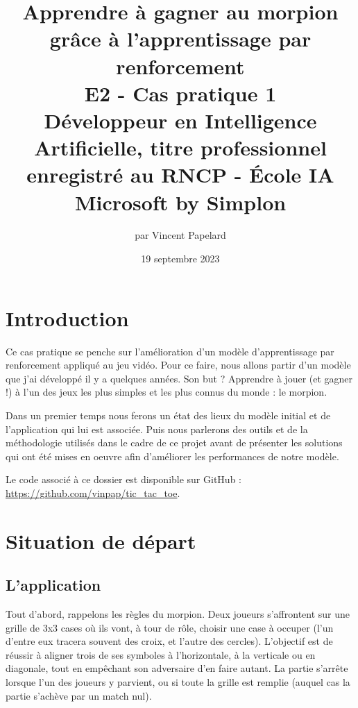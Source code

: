 \documentclass[french]{article}
\title{%
    \huge Apprendre à gagner au morpion grâce à l'apprentissage par renforcement  \\
    \bigskip
    \large E2 - Cas pratique 1 \\ 
    Développeur en Intelligence Artificielle,
    titre professionnel enregistré au RNCP - École IA Microsoft by Simplon}
\date{19 septembre 2023}
\author{par Vincent Papelard}
\begin{document}
    \maketitle
    \newpage
    \tableofcontents
    \newpage

    \section*{Introduction}
    Ce cas pratique se penche sur l'amélioration d'un modèle d'apprentissage par renforcement appliqué au jeu vidéo. Pour ce faire, nous allons partir d'un modèle que j'ai développé il y a quelques années. Son but ? Apprendre à jouer (et gagner !) à l'un des jeux les plus simples et les plus connus du monde : le morpion.
    
    Dans un premier temps nous ferons un état des lieux du modèle initial et de l'application qui lui est associée. Puis nous parlerons des outils et de la méthodologie utilisés dans le cadre de ce projet avant de présenter les solutions qui ont été mises en oeuvre afin d'améliorer les performances de notre modèle.
    
    Le code associé à ce dossier est disponible sur GitHub : 
    \url{https://github.com/vinpap/tic_tac_toe}.

    \section{Situation de départ}
    \subsection{L'application}
    Tout d'abord, rappelons les règles du morpion. Deux joueurs s'affrontent sur une grille de 3x3 cases où ils vont, à tour de rôle, choisir une case à occuper (l'un d'entre eux tracera souvent des croix, et l'autre des cercles). L'objectif est de réussir à aligner trois de ses symboles à l'horizontale, à la verticale ou en diagonale, tout en empêchant son adversaire d'en faire autant. La partie s'arrête lorsque l'un des joueurs y parvient, ou si toute la grille est remplie (auquel cas la partie s'achève par un match nul). 
\end{document}
